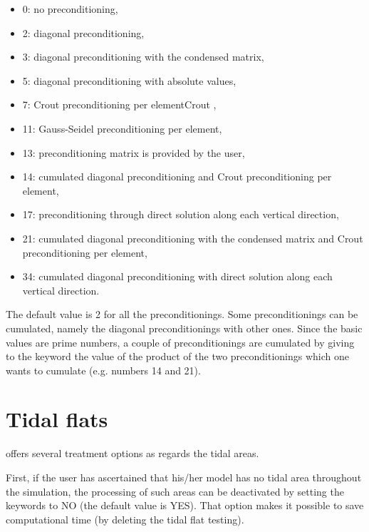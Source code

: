 \begin{itemize}
\item 0:  no preconditioning,

\item 2:  diagonal preconditioning,

\item 3:  diagonal preconditioning with the condensed matrix,

\item 5:  diagonal preconditioning with absolute values,

\item 7:  Crout preconditioning per elementCrout ,

\item 11: Gauss-Seidel preconditioning per element,

\item 13: preconditioning matrix is provided by the user,

\item 14: cumulated diagonal preconditioning and Crout preconditioning per
element,

\item 17:  preconditioning through direct solution along each vertical
direction,

\item 21:  cumulated diagonal preconditioning with the condensed matrix and
Crout preconditioning per element,

\item 34:  cumulated diagonal preconditioning with direct solution along each
vertical direction.
\end{itemize}

The default value is 2 for all the preconditionings. Some preconditionings can
be cumulated, namely the diagonal preconditionings with other ones. Since the
basic values are prime numbers, a couple of preconditionings are cumulated by
giving to the keyword the value of the product of the two preconditionings
which one wants to cumulate (e.g. numbers 14 and 21).

\section{Tidal flats}

 offers several treatment options as regards the tidal areas.

First, if the user has ascertained that his/her model has no tidal area
throughout the simulation, the processing of such areas can be deactivated by
setting the keywords  to NO (the default value is YES).
That option makes it possible to save computational time (by deleting the tidal
flat testing).

